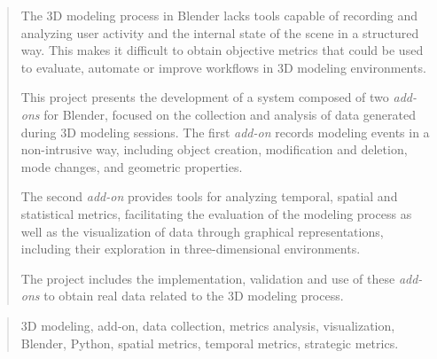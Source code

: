 \documentclass[a4paper,12pt,twoside]{memoir}
\begin{document}
\renewcommand*\abstractname{Abstract}
\begin{abstract}

The 3D modeling process in Blender lacks tools capable of recording and analyzing user activity and the internal state of the scene in a structured way. This makes it difficult to obtain objective metrics that could be used to evaluate, automate or improve workflows in 3D modeling environments.


This project presents the development of a system composed of two \textit{add-ons} for Blender, focused on the collection and analysis of data generated during 3D modeling sessions. The first \textit{add-on} records modeling events in a non-intrusive way, including object creation, modification and deletion, mode changes, and geometric properties.


The second \textit{add-on} provides tools for analyzing temporal, spatial and statistical metrics, facilitating the evaluation of the modeling process as well as the visualization of data through graphical representations, including their exploration in three-dimensional environments.


The project includes the implementation, validation and use of these \textit{add-ons} to obtain real data related to the 3D modeling process.

\end{abstract}

\renewcommand*\abstractname{Keywords}
\begin{abstract}

3D modeling, add-on, data collection, metrics analysis, visualization, Blender, Python, spatial metrics, temporal metrics, strategic metrics.

\end{abstract}

\clearpage

\tableofcontents

\clearpage

\listoffigures

\clearpage

\listoftables
\clearpage

\mainmatter











\end{document}
